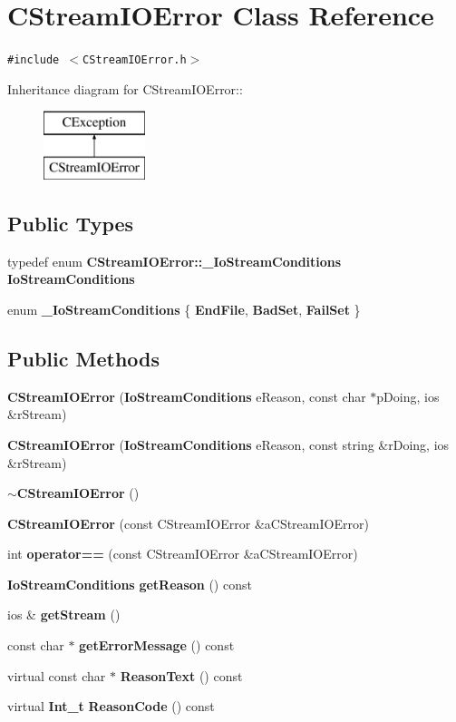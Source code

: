 \section{CStream\-IOError  Class Reference}
\label{classCStreamIOError}
{\tt \#include $<$CStream\-IOError.h$>$}

Inheritance diagram for CStream\-IOError::\begin{figure}[H]
\begin{center}
\leavevmode
\includegraphics[height=2cm]{classCStreamIOError}
\end{center}
\end{figure}
\subsection*{Public Types}
\begin{CompactItemize}
\item 
typedef enum {\bf CStream\-IOError::\_\-Io\-Stream\-Conditions} {\bf Io\-Stream\-Conditions}
\item 
enum {\bf \_\-Io\-Stream\-Conditions} \{ {\bf End\-File}, 
{\bf Bad\-Set}, 
{\bf Fail\-Set}
 \}
\end{CompactItemize}
\subsection*{Public Methods}
\begin{CompactItemize}
\item 
{\bf CStream\-IOError} ({\bf Io\-Stream\-Conditions} e\-Reason, const char $\ast$p\-Doing, ios \&r\-Stream)
\item 
{\bf CStream\-IOError} ({\bf Io\-Stream\-Conditions} e\-Reason, const string \&r\-Doing, ios \&r\-Stream)
\item 
{\bf $\sim$CStream\-IOError} ()
\item 
{\bf CStream\-IOError} (const CStream\-IOError \&a\-CStream\-IOError)
\item 
int {\bf operator==} (const CStream\-IOError \&a\-CStream\-IOError)
\item 
{\bf Io\-Stream\-Conditions} {\bf get\-Reason} () const
\item 
ios \& {\bf get\-Stream} ()
\item 
const char $\ast$ {\bf get\-Error\-Message} () const
\item 
virtual const char $\ast$ {\bf Reason\-Text} () const
\item 
virtual {\bf Int\_\-t} {\bf Reason\-Code} () const
\end{CompactItemize}
